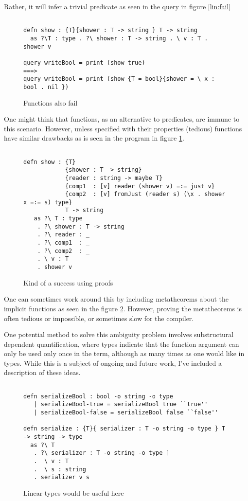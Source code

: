 Rather, it will infer a trivial predicate as seen in the query in figure \ref{lin:fail}

\begin{figure}[H]
\begin{lstlisting}

defn show : {T}{shower : T -> string } T -> string
  as ?\T : type . ?\ shower : T -> string . \ v : T . shower v 

query writeBool = print (show true)
===>
query writeBool = print (show {T = bool}{shower = \ x : bool . nil })

\end{lstlisting}
\caption{Functions also fail}
\label{lin:ffail}
\end{figure}

One might think that functions, as an alternative to predicates, are immune to this scenario. 
However, unless specified with their properties (tedious) functions have similar drawbacks as is seen in the program in figure \ref{lin:ffail}.


\begin{figure}[H]
\begin{lstlisting}

defn show : {T}
            {shower : T -> string}
            {reader : string -> maybe T}
            {comp1  : [v] reader (shower v) =:= just v}
            {comp2  : [v] fromJust (reader s) (\x . shower x =:= s) type}
            T -> string
   as ?\ T : type
    . ?\ shower : T -> string
    . ?\ reader : _
    . ?\ comp1  : _
    . ?\ comp2  : _
    . \ v : T
    . shower v

\end{lstlisting}
\caption{Kind of a success using proofs}
\label{lin:success}
\end{figure}

One can sometimes work around this by including metatheorems about the implicit
functions as seen in the figure \ref{lin:success}. However, proving the metatheorems is often tedious
or impossible, or sometimes slow for the compiler.

One potential method to solve this ambiguity problem involves substructural dependent
quantification, where types indicate that the function argument can only be
used only once in the term, although as many times as one would like in types. While
this is a subject of ongoing and future work, I’ve included a description of these ideas.

\begin{figure}[H]
\begin{lstlisting}

defn serializeBool : bool -o string -o type
   | serializeBool-true = serializeBool true ``true''
   | serializeBool-false = serializeBool false ``false''

defn serialize : {T}{ serializer : T -o string -o type } T -> string -> type
  as ?\ T 
   . ?\ serializer : T -o string -o type ]
   .  \ v : T 
   .  \ s : string 
   . serializer v s

\end{lstlisting}
\caption{Linear types would be useful here}
\label{lin:linideal}
\end{figure}

